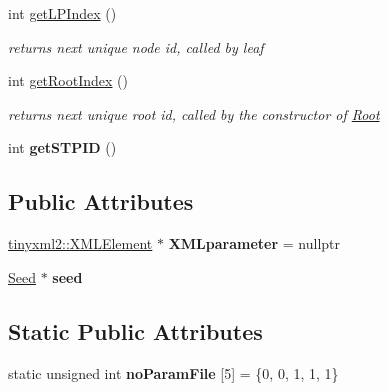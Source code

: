 \begin{DoxyCompactItemize}
\mbox{\label{classCPlantBox_1_1Plant_a6864141cf7c502beee3bd893454e14b2}} 
int \hyperlink{classCPlantBox_1_1Plant_a6864141cf7c502beee3bd893454e14b2}{get\+L\+P\+Index} ()
\begin{DoxyCompactList}\small\item\em returns next unique node id, called by leaf \end{DoxyCompactList}\item 
\mbox{\label{classCPlantBox_1_1Plant_af567950649c7441572e629bf5a6f8a5a}} 
int \hyperlink{classCPlantBox_1_1Plant_af567950649c7441572e629bf5a6f8a5a}{get\+Root\+Index} ()
\begin{DoxyCompactList}\small\item\em returns next unique root id, called by the constructor of \hyperlink{classCPlantBox_1_1Root}{Root} \end{DoxyCompactList}\item 
\mbox{\label{classCPlantBox_1_1Plant_a2f91c06b54ebc7a86fba5ef609284aba}} 
int {\bfseries get\+S\+T\+P\+ID} ()
\end{DoxyCompactItemize}
\subsection*{Public Attributes}
\begin{DoxyCompactItemize}
\item 
\mbox{\label{classCPlantBox_1_1Plant_a767ccbff86e1da4a02f972cbc8d570a9}} 
\hyperlink{classCPlantBox_1_1tinyxml2_1_1XMLElement}{tinyxml2\+::\+X\+M\+L\+Element} $\ast$ {\bfseries X\+M\+Lparameter} = nullptr
\item 
\mbox{\label{classCPlantBox_1_1Plant_a3d8c619f1b5308be9c9a860c191bc04f}} 
\hyperlink{classCPlantBox_1_1Seed}{Seed} $\ast$ {\bfseries seed}
\end{DoxyCompactItemize}
\subsection*{Static Public Attributes}
\begin{DoxyCompactItemize}
\item 
\mbox{\label{classCPlantBox_1_1Plant_a178480fa3f9eb26e773a5811b49efffe}} 
static unsigned int {\bfseries no\+Param\+File} \mbox{[}5\mbox{]} = \{0, 0, 1, 1, 1\}
\end{DoxyCompactItemize}
